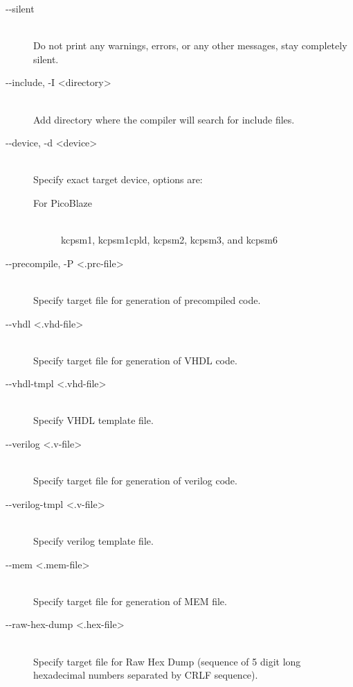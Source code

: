 \begin{description}
            \item[-{}-silent]~\\
                Do not print any warnings, errors, or any other messages, stay completely silent.

            \item[-{}-include, -I <directory>]~\\
                Add directory where the compiler will search for include files.

            \item[-{}-device, -d <device>]~\\
                Specify exact target device, options are:
                \begin{description}
                    \item[For PicoBlaze]~\\
                        kcpsm1, kcpsm1cpld, kcpsm2, kcpsm3, and kcpsm6
                \end{description}

            \item[-{}-precompile, -P <.prc-file>]~\\
                Specify target file for generation of precompiled code.

            \item[-{}-vhdl <.vhd-file>]~\\
                Specify target file for generation of VHDL code.

            \item[-{}-vhdl-tmpl <.vhd-file>]~\\
                Specify VHDL template file.

            \item[-{}-verilog <.v-file>]~\\
                Specify target file for generation of verilog code.

            \item[-{}-verilog-tmpl <.v-file>]~\\
                Specify verilog template file.

            \item[-{}-mem <.mem-file>]~\\
                Specify target file for generation of MEM file.

            \item[-{}-raw-hex-dump <.hex-file>]~\\
                Specify target file for Raw Hex Dump (sequence of 5 digit long hexadecimal numbers separated by CRLF sequence).


\end{description}
